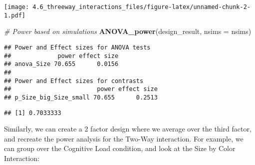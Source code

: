 \documentclass[]{article}
\newenvironment{Shaded}{\begin{snugshade}}{\end{snugshade}}
\newcommand{\KeywordTok}[1]{\textcolor[rgb]{0.13,0.29,0.53}{\textbf{#1}}}
\newcommand{\DataTypeTok}[1]{\textcolor[rgb]{0.13,0.29,0.53}{#1}}
\newcommand{\CommentTok}[1]{\textcolor[rgb]{0.56,0.35,0.01}{\textit{#1}}}
\newcommand{\OperatorTok}[1]{\textcolor[rgb]{0.81,0.36,0.00}{\textbf{#1}}}
\newcommand{\NormalTok}[1]{#1}
\begin{document}
\texttt{[image: 4.6\_threeway\_interactions\_files/figure-latex/unnamed-chunk-2-1.pdf]}

\begin{Shaded}
\begin{Highlighting}[]
\CommentTok{# Power based on simulations}
\KeywordTok{ANOVA_power}\NormalTok{(design_result, }\DataTypeTok{nsims =}\NormalTok{ nsims)}
\end{Highlighting}
\end{Shaded}

\begin{verbatim}
## Power and Effect sizes for ANOVA tests
##             power effect size
## anova_Size 70.655      0.0156
## 
## Power and Effect sizes for contrasts
##                        power effect size
## p_Size_big_Size_small 70.655      0.2513
\end{verbatim}

\begin{Shaded}
\end{Shaded}

\begin{verbatim}
## [1] 0.7033333
\end{verbatim}

Similarly, we can create a 2 factor design where we average over the
third factor, and recreate the power analysis for the Two-Way
interaction. For example, we can group over the Cognitive Load
condition, and look at the Size by Color Interaction:
\end{document}
